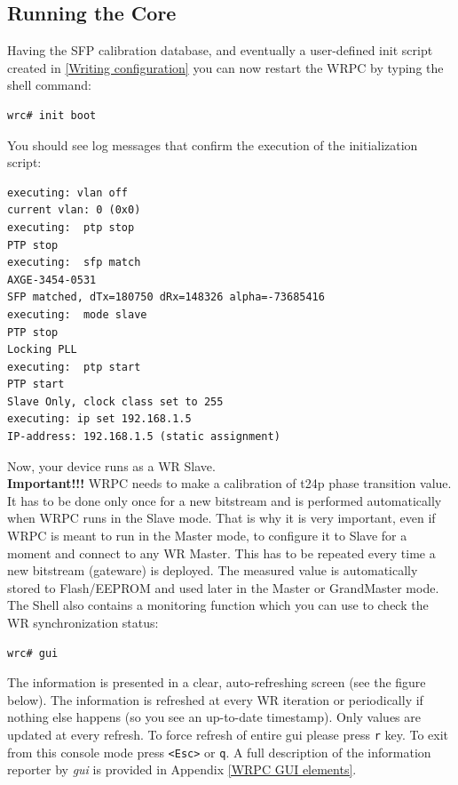 \documentclass[a4paper, 12pt]{article}
\renewcommand{\_}{\underscore\allowbreak}
\begin{document}
\subsection{Running the Core}
\label{Running the Core}

Having the SFP calibration database, and eventually a user-defined init script
created in \ref{Writing configuration} you can now restart the WRPC by typing
the shell command:

\begin{lstlisting}
wrc# init boot
\end{lstlisting}

You should see log messages that confirm the execution of the initialization
script:
\begin{minipage}{\textwidth}
\begin{lstlisting}
executing: vlan off
current vlan: 0 (0x0)
executing:  ptp stop
PTP stop
executing:  sfp match
AXGE-3454-0531
SFP matched, dTx=180750 dRx=148326 alpha=-73685416
executing:  mode slave
PTP stop
Locking PLL
executing:  ptp start
PTP start
Slave Only, clock class set to 255
executing: ip set 192.168.1.5
IP-address: 192.168.1.5 (static assignment)
\end{lstlisting}
\end{minipage}

Now, your device runs as a WR Slave.\\

\textbf{Important!!!} WRPC needs to make a calibration of t24p phase transition
value. It has to be done only once for a new bitstream and is performed
automatically when WRPC runs in the Slave mode. That is why it is very
important, even if WRPC is meant to run in the Master mode, to configure it to
Slave for a moment and connect to any WR Master. This has to be repeated every
time a new bitstream (gateware) is deployed. The measured value is automatically
stored to Flash/EEPROM and used later in the Master or GrandMaster mode.\\

The Shell also contains a monitoring function which you can use to check the
WR synchronization status:

\begin{lstlisting}
wrc# gui
\end{lstlisting}

The information is presented in a clear, auto-refreshing screen (see the
figure below).
The information is refreshed at every WR iteration or periodically if
nothing else happens (so you see an up-to-date timestamp). Only values are
updated at every refresh. To force refresh of entire gui please press
\texttt{r} key. To exit from this console mode press \texttt{<Esc>} or
\texttt{q}. A full description of the information
reporter by \textit{gui} is provided in Appendix \ref{WRPC GUI elements}.
\end{document}
